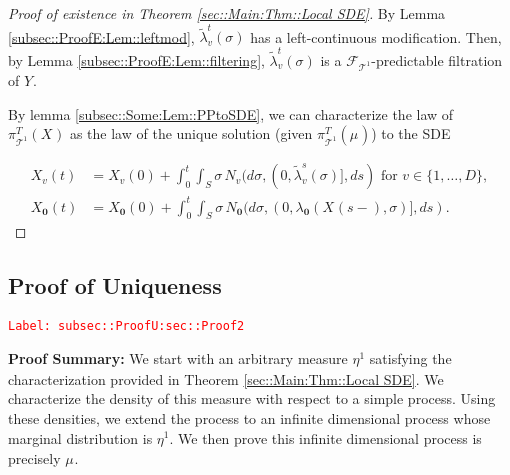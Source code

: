 \documentclass[12pt]{article}
\newcommand{\mc}{\mathcal}
\newcommand{\te}{\text}
\newcommand{\tr}{\textcolor{red}}
\newcommand{\labe}[1]{\tr{\texttt{Label: #1}}}
\newcommand{\pfsum}{\textbf{Proof Summary: }}
\newcommand{\ind}{\hspace{24pt}}
\renewcommand{\root}{\mathbf{0}}				%
\renewcommand{\v}{v}							%
\renewcommand{\S}{S}							%
\newcommand{\s}{\sigma}							%
\newcommand{\T}{T}								%
\renewcommand{\t}{t}							%
\newcommand{\degr}{D}								%
\newcommand{\poiss}[1]{N_{#1}}						%
\newcommand{\pup}[1]{^{#1}}							%
\newcommand{\tree}{\mc{T}}							%
\renewcommand{\tt}{s}								%
\newcommand{\piV}[2]{\pi_{#1}^{#2}}					%
\newcommand{\rxvt}[2]{X_{#1}{(#2)}}					%
\newcommand{\rxvts}[2]{X_{#1}{#2}}					%
\newcommand{\rxvtts}[2]{Y_{#1}{#2}}					%
\newcommand{\m}[3]{\mu_{#2#1}^{#3}}						%
\newcommand{\mmm}[3]{\eta_{#2#1}^{#3}}						%
\newcommand{\rate}[1]{\lambda_{#1}}					%
\newcommand{\crate}[2]{\alt{\lambda}_{#1}^{#2}}		%
\newcommand{\F}[2]{\mc{F}_{#1}^{#2}}				%
\newcommand{\alt}{\widetilde}						%
\begin{document}
\begin{proof}[Proof of existence in Theorem \ref{sec::Main:Thm::Local SDE}]
By Lemma \ref{subsec::ProofE:Lem::leftmod}, \(\crate{\v}{\t}(\s)\) has a left-continuous modification. Then, by Lemma \ref{subsec::ProofE:Lem::filtering}, \(\crate{\v}{\t}(\s)\) is a \(\F{\tree\pup{1}}{}\)-predictable filtration of \(\rxvtts{}{}\).

\ind By lemma \ref{subsec::Some:Lem::PPtoSDE}, we can characterize the law of \(\piV{\tree\pup{1}}{\T}(\rxvts{}{})\) as the law of the unique solution (given \(\piV{\tree\pup{1}}{\T}(\m{}{}{})\)) to the SDE

\begin{align*}
\rxvt{\v}{\t} &= \rxvt{\v}{0} + \int_0^\t\int_\S \s\,\poiss{\v}(d\s,(0,\crate{\v}{\tt}(\s)],d\tt) \te{ for } \v \in \{1,\dots,\degr\},\\
\rxvt{\root}{\t} &= \rxvt{\root}{0} + \int_0^\t\int_\S \s\,\poiss{\root}(d\s,(0,\rate{\root}(\rxvt{}{\tt-},\s)],d\tt).
\end{align*}
\end{proof}

\subsection{Proof of Uniqueness}
\label{subsec::ProofU:sec::Proof2}\labe{subsec::ProofU:sec::Proof2}

\pfsum We start with an arbitrary measure \(\mmm{}{}{1}\) satisfying the characterization provided in Theorem \ref{sec::Main:Thm::Local SDE}. We characterize the density of this measure with respect to a simple process. Using these densities, we extend the process to an infinite dimensional process whose marginal distribution is \(\mmm{}{}{1}\). We then prove this infinite dimensional process is precisely \(\m{}{}{}\).
\end{document}
